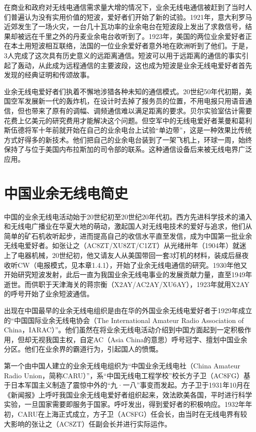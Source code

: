 \documentclass[12pt,UTF8]{ctexbook}
\begin{document}
在商业和政府对无线电通信需求量大增的情况下，业余无线电通信被赶到了当时人们普遍认为没有实用价值的短波，爱好者们开始了新的试验。1921年，意大利罗马近郊发生了一场火灾，一台几十瓦功率的业余电台在短波段上发出了求救信号，结果却被远在千里之外的丹麦业余电台收听到了。1923年，美国的两位业余爱好者正在本土用短波相互联络，法国的一位业余爱好者意外地在欧洲听到了他们。于是，3人完成了这次具有历史意义的远距离通信。短波可以用于远距离的通信的事实引起了轰动，从此成为远程通信的主要波段，这也成为短波是业余无线电爱好者首先发现的经典证明和传颂故事。

业余无线电爱好者们执着不懈地涉猎各种未知的通信模式。20世纪50年代初期，美国空军发展新一代的轰炸机，在设计时去掉了报务员的位置，不用电报只用语音通信，但也带来了原有的调幅、调频通信难以满足距离的要求。贝尔实验室估计需要花费上亿美元的研究费用才能解决这个问题。但空军中的无线电爱好者莱曼和葛利斯伍德将军十年前就开始在自己的业余电台上试验“单边带”，这是一种效果比传统方式好得多的新技术。他们把自己的业余电台装到了一架飞机上，环球一周，始终保持了与位于美国内布拉斯加的司令部的联系。这种通信设备后来被无线电界广泛应用。

\section{中国业余无线电简史}

中国的业余无线电活动始于20世纪初至20世纪20年代初。西方先进科学技术的涌入和无线电广播业在华夏大地的萌动，激起国人对无线电技术的爱好与追求，他们从简单的矿石机收听起步，进而提高自己的收信水平直至发信，成为中国第一批业余无线电爱好者。如张让之（AC8ZT/XU8ZT/C1ZT）从光绪卅年（1904年）就迷上了电器机械，20世纪初，他又请友人从美国带回一套3灯机的材料，装成后昼夜收听CW（电报模式，见本章1.4.1），开始了业余无线电通信的研究。1930年他又开始研究短波发射，此后一直为我国业余无线电事业的发展贡献力量，直至1949年逝世。而供职于天津海关的蒋宗衡（X2AY/AC2AY/XU6AY），1923年就用X2AY的呼号开始了业余短波通信。

出现在中国最早的业余无线电组织是由在华的外国业余无线电爱好者于1929年成立的“中国国际业余无线电协会（The International Amateur Radio Association of China，IARAC）”。他们虽然在将业余无线电活动介绍到中国方面起到一定积极作用，但却无视我国主权，自定AC（Asia China的意思）呼号冠字、擅划中国业余分区。他们在业余界的霸道行为，引起国人的愤慨。

第一个由中国人建立的业余无线电组织为“中国业余无线电社（China Amateur Radio Union，简称CARU）”，系“中国无线电工程学校”校长方子卫（AC8FG）基于日本军国主义制造了震惊中外的“九·一八”事变而发起。方子卫于1931年10月在《新闻报》上呼吁我国业余无线电爱好者组织起来，效法欧美各国，平时进行科学实验，一旦国家需要即服务于国家。呼吁发出，得到爱好者的积极响应。1932年年初，CARU在上海正式成立，方子卫（AC8FG）任会长，由当时在无线电界有较大影响的张让之（AC8ZT）任副会长并进行实际运作。
\end{document}

